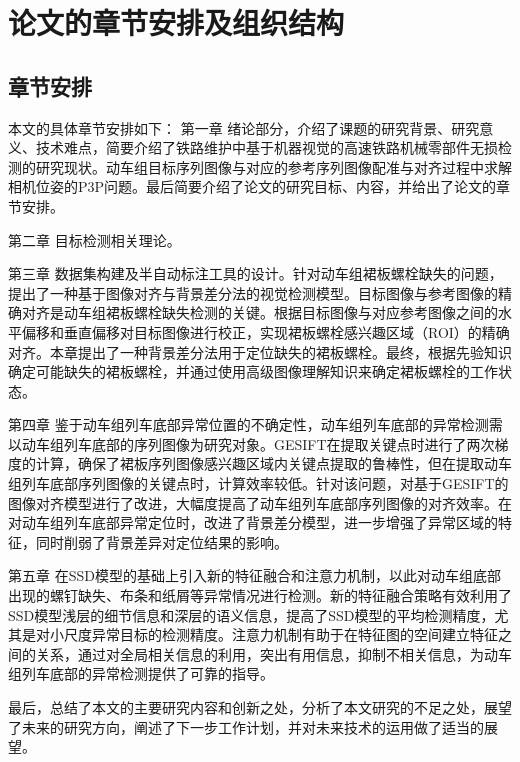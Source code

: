 \section{论文的章节安排及组织结构}
\subsection{章节安排}
本文的具体章节安排如下：
第一章 绪论部分，介绍了课题的研究背景、研究意义、技术难点，简要介绍了铁路维护中基于机器视觉的高速铁路机械零部件无损检测的研究现状。动车组目标序列图像与对应的参考序列图像配准与对齐过程中求解相机位姿的P3P问题。最后简要介绍了论文的研究目标、内容，并给出了论文的章节安排。
 
第二章 目标检测相关理论。

第三章 数据集构建及半自动标注工具的设计。针对动车组裙板螺栓缺失的问题，提出了一种基于图像对齐与背景差分法的视觉检测模型。目标图像与参考图像的精确对齐是动车组裙板螺栓缺失检测的关键。根据目标图像与对应参考图像之间的水平偏移和垂直偏移对目标图像进行校正，实现裙板螺栓感兴趣区域（ROI）的精确对齐。本章提出了一种背景差分法用于定位缺失的裙板螺栓。最终，根据先验知识确定可能缺失的裙板螺栓，并通过使用高级图像理解知识来确定裙板螺栓的工作状态。

第四章 鉴于动车组列车底部异常位置的不确定性，动车组列车底部的异常检测需以动车组列车底部的序列图像为研究对象。GESIFT在提取关键点时进行了两次梯度的计算，确保了裙板序列图像感兴趣区域内关键点提取的鲁棒性，但在提取动车组列车底部序列图像的关键点时，计算效率较低。针对该问题，对基于GESIFT的图像对齐模型进行了改进，大幅度提高了动车组列车底部序列图像的对齐效率。在对动车组列车底部异常定位时，改进了背景差分模型，进一步增强了异常区域的特征，同时削弱了背景差异对定位结果的影响。

第五章 在SSD模型的基础上引入新的特征融合和注意力机制，以此对动车组底部出现的螺钉缺失、布条和纸屑等异常情况进行检测。新的特征融合策略有效利用了SSD模型浅层的细节信息和深层的语义信息，提高了SSD模型的平均检测精度，尤其是对小尺度异常目标的检测精度。注意力机制有助于在特征图的空间建立特征之间的关系，通过对全局相关信息的利用，突出有用信息，抑制不相关信息，为动车组列车底部的异常检测提供了可靠的指导。

最后，总结了本文的主要研究内容和创新之处，分析了本文研究的不足之处，展望了未来的研究方向，阐述了下一步工作计划，并对未来技术的运用做了适当的展望。
